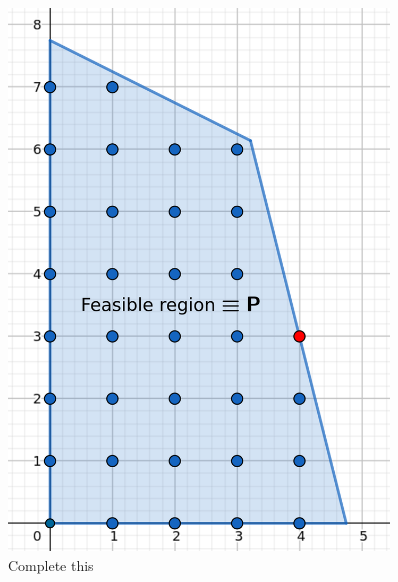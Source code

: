 \begin{figure}[h]
\centering
\begin{minipage}[b]{0.45\textwidth}
    \centering
    \includegraphics[width=0.9\textwidth]{images/IP(12).png}
    \caption{Complete this}
\end{minipage}
\hfill
\begin{minipage}[b]{0.45\textwidth}
    \centering

\end{minipage}
\end{figure}
